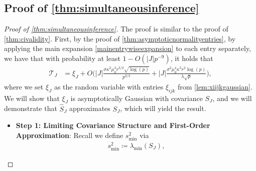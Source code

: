 \documentclass[10pt]{article}
\newcommand{\0}{{\mathbf{0}}}
\newcommand{\1}{{\mathbf{1}}}
\renewcommand{\hat}{\widehat}
\renewcommand{\hat}{\widehat}
\begin{document}
\subsection{Proof of \cref{thm:simultaneousinference}}



\begin{proof}[Proof of \cref{thm:simultaneousinference}]
The proof is similar to the proof of \cref{thm:civalidity}. First, by the proof of \cref{thm:asymptoticnormalityentries}, by applying the main expansion \eqref{mainentrywiseexpansion} to each entry separately, we have that with probability at least $1 - O(|J|p^{-9})$, it holds that
\begin{align*}
    \mathcal{T}_{J} &= \xi_{J} + O\bigg( |J|\frac{\sigma \kappa^2 \mu_0^3 r^{3/2} \sqrt{\log(p)}}{p^{3/2}} + |J| \frac{\sigma^2 \mu_0^4 \kappa^3 r^2 \log(p)}{\lambda \sqrt{p}} \bigg),
\end{align*}
where we set $\xi_J$ as the random variable with entries $\xi_{ijk}$ from \cref{lem:xiijkgaussian}.  We will show that $\xi_J$ is asymptotically Gaussian with covariance $S_J$, and we will demonstrate that $\hat S_J$ approximates $S_J$, which will yield the result.  
\begin{itemize}
\item \textbf{Step 1: Limiting Covariance Structure and First-Order Approximation}: 
Recall we define $s^2_{\min}$ via
\begin{align*}
    s^2_{\min} \coloneqq \lambda_{\min}(S_J),
\end{align*}

\end{itemize}
\end{proof}
\end{document}
